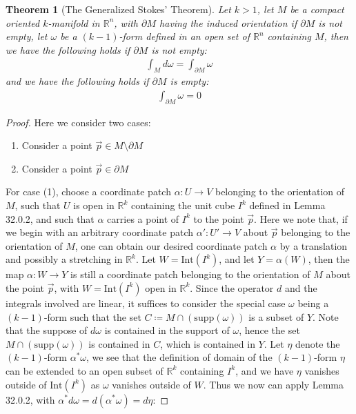 \documentclass[15pt]{book}
\theoremstyle{break}
\theoremstyle{break}
\newtheorem{thm}{Theorem}[section]
\newcommand{\R}{\mathbb{R}}
\newcommand{\Int}{\text{Int}}
\newcommand{\supp}{\text{supp}}
\begin{document}
\begin{thm}[The Generalized Stokes' Theorem]
Let $k>1$, let $M$ be a compact oriented $k$-manifold in $\R^n$, with $\partial M$ having the induced orientation if $\partial M$ is not empty, let $\omega$ be a $(k-1)$-form defined in an open set of $\R^n$ containing $M$, then we have the following holds if $\partial M$ is not empty:
\begin{align*}
\int_M d\omega  = \int_{\partial M}\omega
\end{align*}
and we have the following holds if $\partial M$ is empty:
\begin{align*}
\int_{\partial M}\omega = 0
\end{align*}
\end{thm}
\begin{proof}
Here we consider two cases: 
\begin{enumerate}[topsep=3pt,itemsep=-1ex,partopsep=1ex,parsep=1ex]
\item Consider a point $\vec{p}\in M \setminus \partial M$
\item Consider a point $\vec{p}\in \partial M$
\end{enumerate}
For case (1), choose a coordinate patch $\alpha:U \to V$ belonging to the orientation of $M$, such that $U$ is open in $\R^k$ containing the unit cube $I^k$ defined in Lemma 32.0.2, and such that $\alpha$ carries a point of $I^k$ to the point $\vec{p}$. Here we note that, if we begin with an arbitrary coordinate patch $\alpha': U' \to V$ about $\vec{p}$ belonging to the orientation of $M$, one can obtain our desired coordinate patch $\alpha$ by a translation and possibly a stretching in $\R^k$. Let $W = \Int(I^k)$, and let $Y = \alpha(W)$, then the map $\alpha:W \to Y$ is still a coordinate patch belonging to the orientation of $M$ about the point $\vec{p}$, with $W = \Int(I^k)$ open in $\R^k$. Since the operator $d$ and the integrals involved are linear, it suffices to consider the special case $\omega$ being a $(k-1)$-form such that the set $C\coloneqq M\cap (\supp(\omega))$ is a subset of $Y$. Note that the suppose of $d\omega$ is contained in the support of $\omega$, hence the set $M\cap (\supp(\omega))$ is contained in $C$, which is contained in $Y$. Let $\eta$ denote the $(k-1)$-form $\alpha^*\omega$, we see that the definition of domain of the $(k-1)$-form $\eta$ can be extended to an open subset of $\R^k$ containing $I^k$, and we have $\eta$ vanishes outside of $\Int(I^k)$ as $\omega$ vanishes outside of $W$. Thus we now can apply Lemma 32.0.2, with $\alpha^*d\omega = d(\alpha^*\omega) = d\eta$:

\end{proof}
\end{document}
